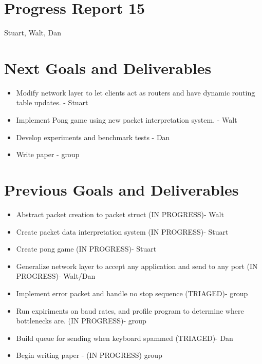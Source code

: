 \documentclass{article}
\begin{document}
\section*{Progress Report 15}
Stuart, Walt, Dan

\section*{Next Goals and Deliverables}
\begin{itemize}
    \item Modify network layer to let clients act as routers and have dynamic routing table updates. - Stuart
    \item Implement Pong game using new packet interpretation system. - Walt
    \item Develop experiments and benchmark tests - Dan
    \item Write paper - group
    
\end{itemize}

\section*{Previous Goals and Deliverables}
\begin{itemize}
    \item Abstract packet creation to packet struct (IN PROGRESS)- Walt
    \item Create packet data interpretation system (IN PROGRESS)- Stuart
    \item Create pong game (IN PROGRESS)- Stuart
    \item Generalize network layer to accept any application and send to any port (IN PROGRESS)- Walt/Dan
    \item Implement error packet and handle no stop sequence (TRIAGED)- group
    \item Run expiriments on baud rates, and profile program to determine where bottlenecks are. (IN PROGRESS)- group
    \item Build queue for sending when keyboard spammed (TRIAGED)- Dan
    \item Begin writing paper - (IN PROGRESS) group
\end{itemize}
\end{document}
